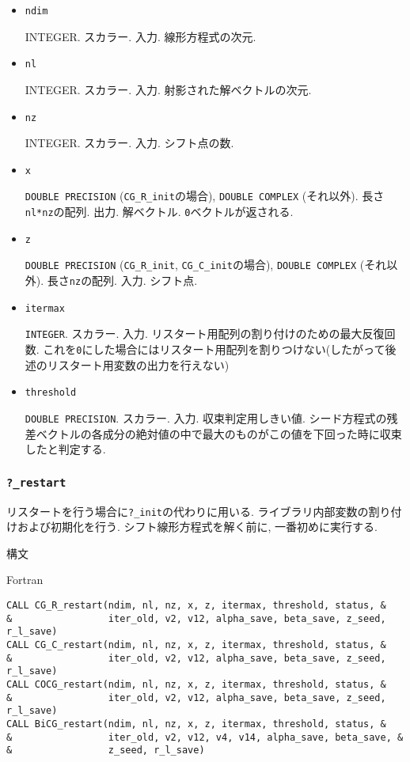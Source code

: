 \documentclass[12pt,titlepage]{jarticle}
\begin{document}
\begin{itemize}

\item \verb|ndim|

  INTEGER. スカラー. 入力. 線形方程式の次元.

\item \verb|nl|

  INTEGER. スカラー. 入力. 射影された解ベクトルの次元.

\item \verb|nz|

  INTEGER. スカラー. 入力. シフト点の数.

\item \verb|x|

  \verb|DOUBLE PRECISION| (\verb|CG_R_init|の場合),
  \verb|DOUBLE COMPLEX| (それ以外).
  長さ \verb|nl*nz|の配列. 出力.
  解ベクトル. \verb|0|ベクトルが返される.

\item \verb|z|

  \verb|DOUBLE PRECISION| (\verb|CG_R_init|, \verb|CG_C_init|の場合),
  \verb|DOUBLE COMPLEX| (それ以外).
  長さ\verb|nz|の配列. 入力. シフト点.

\item \verb|itermax|

  \verb|INTEGER|. スカラー. 入力. リスタート用配列の割り付けのための最大反復回数.
  これを\verb|0|にした場合にはリスタート用配列を割りつけない(したがって後述のリスタート用変数の出力を行えない)

\item \verb|threshold|

  \verb|DOUBLE PRECISION|. スカラー. 入力. 収束判定用しきい値.
  シード方程式の残差ベクトルの各成分の絶対値の中で最大のものがこの値を下回った時に収束したと判定する.

\end{itemize}

\subsubsection{\texttt{?\_restart}}

  リスタートを行う場合に\verb|?_init|の代わりに用いる.
  ライブラリ内部変数の割り付けおよび初期化を行う.
  シフト線形方程式を解く前に, 一番初めに実行する.

  \noindent 構文

  \noindent Fortran
  
\begin{verbatim}
CALL CG_R_restart(ndim, nl, nz, x, z, itermax, threshold, status, &
&                 iter_old, v2, v12, alpha_save, beta_save, z_seed, r_l_save)
CALL CG_C_restart(ndim, nl, nz, x, z, itermax, threshold, status, &
&                 iter_old, v2, v12, alpha_save, beta_save, z_seed, r_l_save)
CALL COCG_restart(ndim, nl, nz, x, z, itermax, threshold, status, &
&                 iter_old, v2, v12, alpha_save, beta_save, z_seed, r_l_save)
CALL BiCG_restart(ndim, nl, nz, x, z, itermax, threshold, status, &
&                 iter_old, v2, v12, v4, v14, alpha_save, beta_save, &
&                 z_seed, r_l_save)
\end{verbatim}
\end{document}
